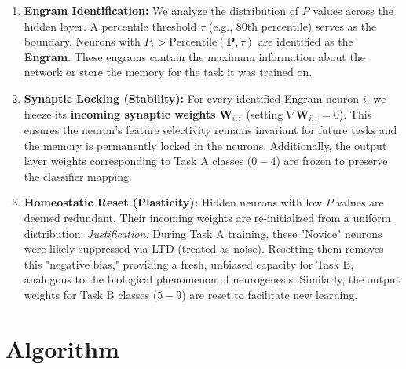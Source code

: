 \documentclass[5p,times]{elsarticle}
\begin{document}
\begin{enumerate}
    \item \textbf{Engram Identification:} We analyze the distribution of $P$ values across the hidden layer. A percentile threshold $\tau$ (e.g., 80th percentile) serves as the boundary. Neurons with $P_i > \text{Percentile}(\mathbf{P}, \tau)$ are identified as the \textbf{Engram}. These engrams contain the maximum information about the network or store the memory for the task it was trained on.
    
    \item \textbf{Synaptic Locking (Stability):} For every identified Engram neuron $i$, we freeze its \textbf{incoming synaptic weights} $\mathbf{W}_{i,:}$ (setting $\nabla \mathbf{W}_{i,:} = 0$). This ensures the neuron's feature selectivity remains invariant for future tasks and the memory is permanently locked in the neurons. Additionally, the output layer weights corresponding to Task A classes ($0-4$) are frozen to preserve the classifier mapping.
    
    \item \textbf{Homeostatic Reset (Plasticity):} Hidden neurons with low $P$ values are deemed redundant. Their incoming weights are re-initialized from a uniform distribution:
    \textit{Justification:} During Task A training, these "Novice" neurons were likely suppressed via LTD (treated as noise). Resetting them removes this "negative bias," providing a fresh, unbiased capacity for Task B, analogous to the biological phenomenon of neurogenesis. Similarly, the output weights for Task B classes ($5-9$) are reset to facilitate new learning.
\end{enumerate}

\section{Algorithm}
\end{document}
